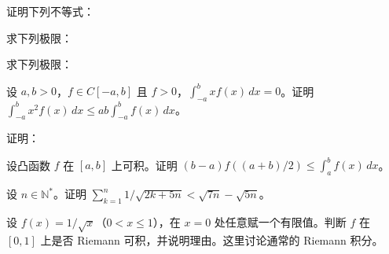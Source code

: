 \noindent\begin{minipage}{\textwidth}
证明下列不等式：
\end{minipage}\par\vfill
\noindent\begin{minipage}{\textwidth}
求下列极限：
\end{minipage}\par\vfill
\newpage
\noindent\begin{minipage}{\textwidth}
求下列极限：
\end{minipage}\par\vfill
\noindent\begin{minipage}{\textwidth}
设 $a,b>0$，$f\in C[-a,b]$ 且 $f>0$，$\int_{-a}^b xf(x)\,dx=0$。证明 $\int_{-a}^b x^2f(x)\,dx\le ab\int_{-a}^b f(x)\,dx$。
\end{minipage}\par\vfill
\noindent\begin{minipage}{\textwidth}
证明：
\end{minipage}\par\vfill
\newpage
\noindent\begin{minipage}{\textwidth}
设凸函数 $f$ 在 $[a,b]$ 上可积。证明 $(b-a)f((a+b)/2)\le\int_a^b f(x)\,dx$。
\end{minipage}\par\vfill
\noindent\begin{minipage}{\textwidth}
设 $n\in\mathbb N^*$。证明 $\sum_{k=1}^n1/\sqrt{2k+5n}<\sqrt{7n}-\sqrt{5n}$。
\end{minipage}\par\vfill
\noindent\begin{minipage}{\textwidth}
设 $f(x)=1/\sqrt{x}$（$0<x\le1$），在 $x=0$ 处任意赋一个有限值。判断 $f$ 在 $[0,1]$ 上是否 Riemann 可积，并说明理由。这里讨论通常的 Riemann 积分。
\end{minipage}\par\vfill
